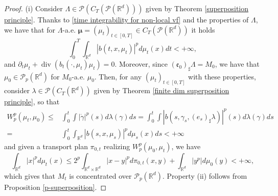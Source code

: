 \documentclass[10pt,leqno]{amsart}
\numberwithin{equation}{section}
\newcommand{\R}{\mathbb{R}}
\newcommand{\PP}{\mathcal{P}}
\begin{document}
\begin{proof}
    (i) Consider $\Lambda \in \PP(C_T(\PP(\R^d)))$ given by Theorem \ref{superposition principle}. Thanks to \eqref{time integrability for non-local vf} and the properties of $\Lambda$, we have that for $\Lambda$-a.e. $\boldsymbol{\mu} = (\mu_t)_{t\in [0,T]}\in C_T(\PP(\R^d))$ it holds
    \[\int_0^T \int_{\R^d} |b(t,x,\mu_t)|^p d\mu_t(x) dt<+\infty,\]
    and $\partial_t\mu_t + \operatorname{div} (b_t(\cdot,\mu_t)\mu_t )= 0$. Moreover, since $(\mathfrak{e}_0)_\sharp \Lambda = M_0$, we have that $\mu_0\in \PP_p(\R^d)$ for $M_0$-a.e. $\mu_0$. Then, for any $(\mu_t)_{t\in [0,T]}$ with these properties, consider $\lambda \in \PP(C_T(\R^d))$ given by Theorem \ref{finite dim superposition principle}, so that 
    \begin{align*}
        W_p^p(\mu_t,\mu_0) \leq & \int_0^t \int |\dot\gamma|^p(s)d\lambda(\gamma)ds 
        =  
        \int_0^t \int |b(s,\gamma_s,(e_s)_\sharp \lambda)|^p(s) d\lambda(\gamma)ds 
        \\
        = &
        \int_0^t \int_{\R^d} |b(s,x,\mu_s)|^p d\mu_s(x) ds <+\infty
    \end{align*}
    and given a transport plan $\pi_{0,t}$ realizing $W_p^p(\mu_0,\mu_t)$, we have    \begin{equation}\label{p-moment estimate}
        \int_{\R^d} |x|^p d\mu_t(x) \leq 2^p\int_{\R^d\times \R^d} |x-y|^p d\pi_{0,t}(x,y) + \int_{\R^d}|y^p| d\mu_0(y)<+\infty,
    \end{equation}
    which gives that $M_t$ is concentrated over $\PP_p(\R^d)$. Property (ii) follows from Proposition \ref{p-superposition}.
\end{proof}
\end{document}
